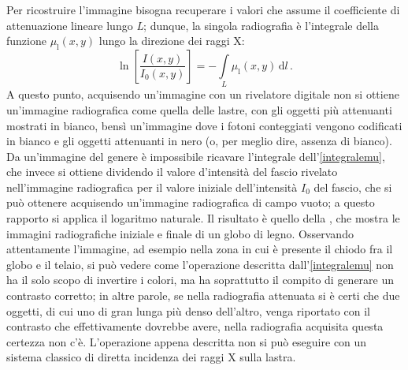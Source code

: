 \noindent Per ricostruire l'immagine bisogna recuperare i valori che assume il coefficiente di attenuazione lineare lungo \textit{L}; dunque, la singola radiografia è l'integrale della funzione $\mu_\mathrm{l}(x,y)$ lungo la direzione dei raggi X:
\begin{equation}\label{integralemu}
    \ln{ \left[ \frac{I(x,y)}{I_0(x,y)} \right]} = -\int\limits_L \mu_\mathrm{l} (x,y)\,\mathrm{d}l\,.
\end{equation}
A questo punto, acquisendo un'immagine con un rivelatore digitale non si ottiene un'immagine radiografica come quella delle lastre, con gli oggetti più attenuanti mostrati in bianco, bensì un'immagine dove i fotoni conteggiati vengono codificati in bianco e gli oggetti attenuanti in nero (o, per meglio dire, assenza di bianco). Da un'immagine del genere è impossibile ricavare l'integrale dell'\eqref{integralemu}, che invece si ottiene dividendo il valore d'intensità del fascio rivelato nell'immagine radiografica per il valore iniziale dell'intensità $I_0$ del fascio, che si può ottenere acquisendo un'immagine radiografica di campo vuoto; a questo rapporto si applica il logaritmo naturale. Il risultato è quello della , che mostra le immagini radiografiche iniziale e finale di un globo di legno. Osservando attentamente l'immagine, ad esempio nella zona in cui è presente il chiodo fra il globo e il telaio, si può vedere come l'operazione descritta dall'\eqref{integralemu} non ha il solo scopo di invertire i colori, ma ha soprattutto il compito di generare un contrasto corretto; in altre parole, se nella radiografia attenuata si è certi che due oggetti, di cui uno di gran lunga più denso dell'altro, venga riportato con il contrasto che effettivamente dovrebbe avere, nella radiografia acquisita questa certezza non c'è. L'operazione appena descritta non si può eseguire con un sistema classico di diretta incidenza dei raggi X sulla lastra.

